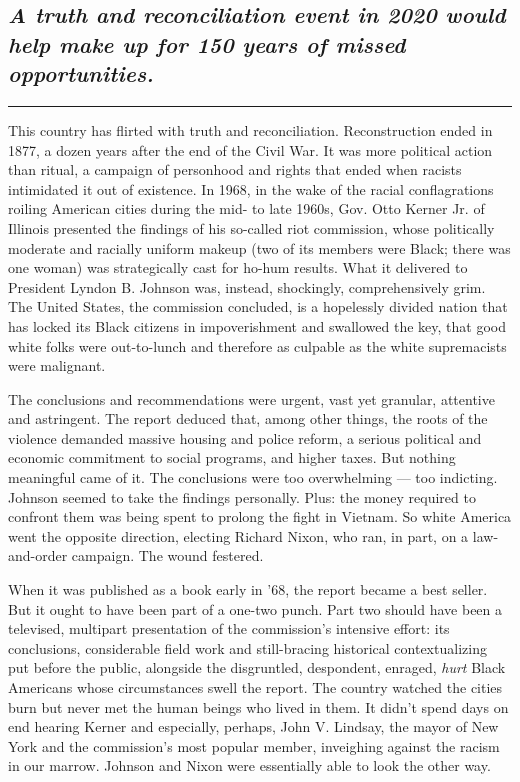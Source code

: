 \hypertarget{a-truth-and-reconciliation-event-in-2020-would-help-make-up-for-150-years-of-missed-opportunities}{%
\subsection{\texorpdfstring{\emph{A truth and reconciliation event in
2020 would help make up for 150 years of missed
opportunities.}}{A truth and reconciliation event in 2020 would help make up for 150 years of missed opportunities.}}\label{a-truth-and-reconciliation-event-in-2020-would-help-make-up-for-150-years-of-missed-opportunities}}

\begin{center}\rule{0.5\linewidth}{\linethickness}\end{center}

This country has flirted with truth and reconciliation. Reconstruction
ended in 1877, a dozen years after the end of the Civil War. It was more
political action than ritual, a campaign of personhood and rights that
ended when racists intimidated it out of existence. In 1968, in the wake
of the racial conflagrations roiling American cities during the mid- to
late 1960s, Gov. Otto Kerner Jr. of Illinois presented the findings of
his so-called riot commission, whose politically moderate and racially
uniform makeup (two of its members were Black; there was one woman) was
strategically cast for ho-hum results. What it delivered to President
Lyndon B. Johnson was, instead, shockingly, comprehensively grim. The
United States, the commission concluded, is a hopelessly divided nation
that has locked its Black citizens in impoverishment and swallowed the
key, that good white folks were out-to-lunch and therefore as culpable
as the white supremacists were malignant.

The conclusions and recommendations were urgent, vast yet granular,
attentive and astringent. The report deduced that, among other things,
the roots of the violence demanded massive housing and police reform, a
serious political and economic commitment to social programs, and higher
taxes. But nothing meaningful came of it. The conclusions were too
overwhelming --- too indicting. Johnson seemed to take the findings
personally. Plus: the money required to confront them was being spent to
prolong the fight in Vietnam. So white America went the opposite
direction, electing Richard Nixon, who ran, in part, on a law-and-order
campaign. The wound festered.

When it was published as a book early in '68, the report became a best
seller. But it ought to have been part of a one-two punch. Part two
should have been a televised, multipart presentation of the commission's
intensive effort: its conclusions, considerable field work and
still-bracing historical contextualizing put before the public,
alongside the disgruntled, despondent, enraged, \emph{hurt} Black
Americans whose circumstances swell the report. The country watched the
cities burn but never met the human beings who lived in them. It didn't
spend days on end hearing Kerner and especially, perhaps, John V.
Lindsay, the mayor of New York and the commission's most popular member,
inveighing against the racism in our marrow. Johnson and Nixon were
essentially able to look the other way.

